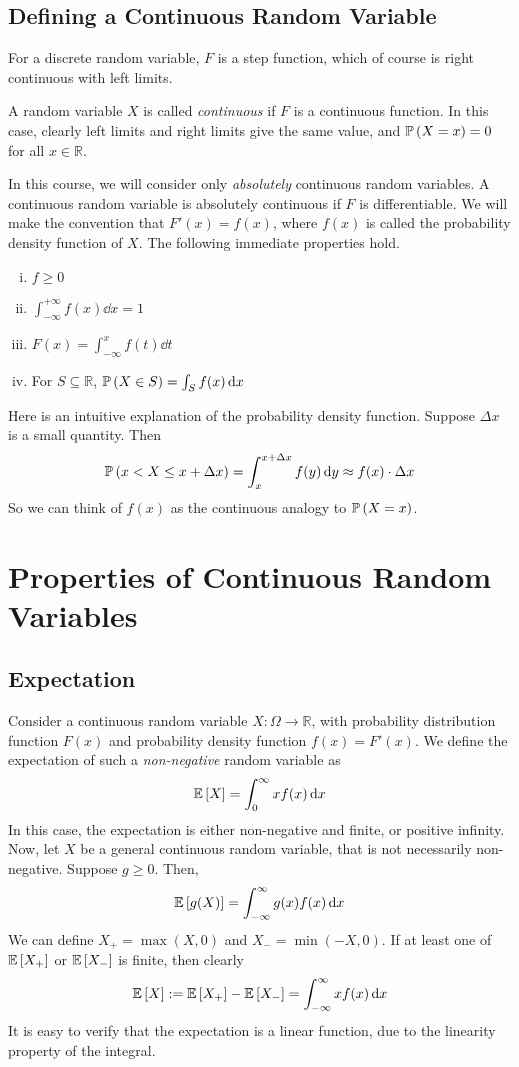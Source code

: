 \documentclass{article}
\begin{document}
\subsection{Defining a Continuous Random Variable}
For a discrete random variable, $F$ is a step function, which of course is right continuous with left limits.
\begin{definition}
	A random variable $X$ is called \textit{continuous} if $F$ is a continuous function. In this case, clearly left limits and right limits give the same value, and $\mathbb{P}\left({X = x}\right) = 0$ for all $x \in\mathbb R$.
\end{definition}
\noindent In this course, we will consider only \textit{absolutely} continuous random variables. A continuous random variable is absolutely continuous if $F$ is differentiable. We will make the convention that $F'(x) = f(x)$, where $f(x)$ is called the probability density function of $X$. The following immediate properties hold.
\begin{enumerate}[(i)]
	\item $f \geq 0$
	\item $\int_{-\infty}^{+\infty} f(x) \dd{x} = 1$
	\item $F(x) = \int_{-\infty}^x f(t) \dd{t}$
	\item For $S \subseteq \mathbb R$, $\mathbb{P}\left({X \in S}\right) = \int_S f(x) \dd{x}$
\end{enumerate}
Here is an intuitive explanation of the probability density function. Suppose $\Delta x$ is a small quantity. Then
\[ \mathbb{P}\left({x < X \leq x + \Delta x}\right) = \int_x^{x + \Delta x} f(y) \dd{y} \approx f(x) \cdot \Delta x \]
So we can think of $f(x)$ as the continuous analogy to $\mathbb{P}\left({X = x}\right)$.

\section{Properties of Continuous Random Variables}
\subsection{Expectation}
Consider a continuous random variable $X \colon \Omega \to \mathbb R$, with probability distribution function $F(x)$ and probability density function $f(x) = F'(x)$. We define the expectation of such a \textit{non-negative} random variable as
\[ \mathbb{E}\left[{X}\right] = \int_0^\infty x f(x) \dd{x} \]
In this case, the expectation is either non-negative and finite, or positive infinity. Now, let $X$ be a general continuous random variable, that is not necessarily non-negative. Suppose $g \geq 0$. Then,
\[ \mathbb{E}\left[{g(X)}\right] = \int_{-\infty}^\infty g(x) f(x) \dd{x} \]
We can define $X_+ = \max(X, 0)$ and $X_- = \min(-X, 0)$. If at least one of $\mathbb{E}\left[{X_+}\right]$ or $\mathbb{E}\left[{X_-}\right]$ is finite, then clearly
\[ \mathbb{E}\left[{X}\right] := \mathbb{E}\left[{X_+}\right] - \mathbb{E}\left[{X_-}\right] = \int_{-\infty}^\infty xf(x) \dd{x} \]
It is easy to verify that the expectation is a linear function, due to the linearity property of the integral.
\end{document}
